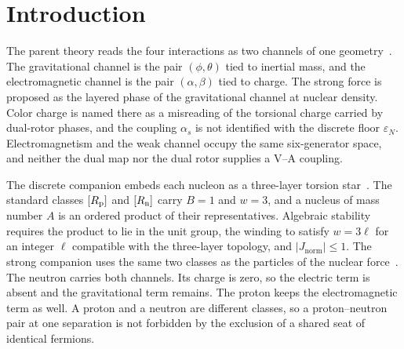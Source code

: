 \documentclass[a4paper]{article}
\newcommand{\Jnorm}{J_{\mathrm{norm}}}
\begin{document}
\begin{abstract}
On the equal-scale locus the magnetic square equals the unsigned mass, and so does the electric square. A positive mass there is magnetic, whether or not the electromagnetic label is on. With the label at zero, a charge times a vector potential does not move the dual angle, and the magnetic summand exerts no force on a body at rest. The generator that holds one axis is the parallel magnetic rotor. A dual phase \(2\pi\) on that axis sends the rotor to \(-1\), and a dual phase \(4\pi\) restores the identity. The free gap, still an input, is on that locus an excess of the magnetic square. A nonnegative magnetic increment enlarges that square, and the unsigned mass rises by half the enlargement. The decrease of a dual angle that spends the square writes attraction.

The V--A coupling, the lifetime, the shape of the spectrum, \(g_A/g_V\), the Fermi constant, the neutrino mass, the generations, the Cabibbo--Kobayashi--Maskawa matrix, the structure functions, the ratio \(R\), the absolute mass gap, and either moment in nuclear magnetons are not derived.
\end{abstract}

\section{Introduction}
\label{sec:intro}

The parent theory reads the four interactions as two channels of one geometry~\cite{dst-main}. The gravitational channel is the pair \((\phi,\theta)\) tied to inertial mass, and the electromagnetic channel is the pair \((\alpha,\beta)\) tied to charge. The strong force is proposed as the layered phase of the gravitational channel at nuclear density. Color charge is named there as a misreading of the torsional charge carried by dual-rotor phases, and the coupling \(\alpha_s\) is not identified with the discrete floor \(\varepsilon_N\). Electromagnetism and the weak channel occupy the same six-generator space, and neither the dual map nor the dual rotor supplies a V--A coupling.

The discrete companion embeds each nucleon as a three-layer torsion star~\cite{dst-dio}. The standard classes \([R_{\rm p}]\) and \([R_{\rm n}]\) carry \(B=1\) and \(w=3\), and a nucleus of mass number \(A\) is an ordered product of their representatives. Algebraic stability requires the product to lie in the unit group, the winding to satisfy \(w=3\ell\) for an integer \(\ell\) compatible with the three-layer topology, and \(|\Jnorm|\le 1\). The strong companion uses the same two classes as the particles of the nuclear force~\cite{dst-strong}. The neutron carries both channels. Its charge is zero, so the electric term is absent and the gravitational term remains. The proton keeps the electromagnetic term as well. A proton and a neutron are different classes, so a proton--neutron pair at one separation is not forbidden by the exclusion of a shared seat of identical fermions.
\end{document}
